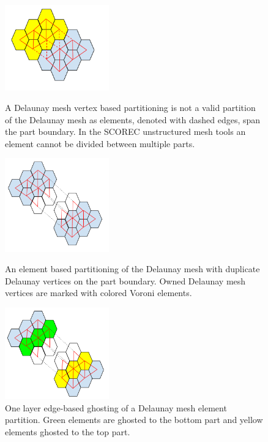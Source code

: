 \documentclass[a4paper]{article}
\begin{document}
\begin{figure}
\centering
\includegraphics[width=0.4\textwidth]{ghostingOwnershipFig2.png}
\caption{\label{fig:ownership2}
  A Delaunay mesh vertex based partitioning is not a valid partition of the
  Delaunay mesh as elements, denoted with dashed edges, span the part boundary.
  In the SCOREC unstructured mesh tools an element cannot be divided between
  multiple parts.
}
\includegraphics[width=0.4\textwidth]{ghostingOwnershipFig3.png}
\caption{\label{fig:ownership3}
  An element based partitioning of the Delaunay mesh with duplicate Delaunay
  vertices on the part boundary.
  Owned Delaunay mesh vertices are marked with colored Voroni elements.
}

\includegraphics[width=0.4\textwidth]{ghostingOwnershipFig4.png}
\caption{\label{fig:ownership4}
  One layer edge-based ghosting of a Delaunay mesh element partition.
  Green elements are ghosted to the bottom part and yellow elements ghosted to
  the top part.
}
\end{figure}
\end{document}
